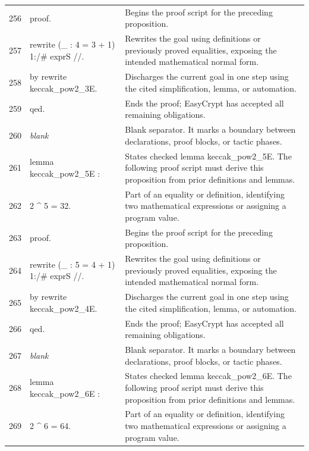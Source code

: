 \documentclass[10pt]{article}
\begin{document}
\begin{longtable}{r L{0.53\textwidth} L{0.37\textwidth}}
256 & {\ttfamily\scriptsize proof.} & Begins the proof script for the preceding proposition. \\
257 & {\ttfamily\scriptsize rewrite (\_ : 4 = 3 + 1) 1:/\# exprS //.} & Rewrites the goal using definitions or previously proved equalities, exposing the intended mathematical normal form. \\
258 & {\ttfamily\scriptsize by rewrite keccak\_pow2\_3E.} & Discharges the current goal in one step using the cited simplification, lemma, or automation. \\
259 & {\ttfamily\scriptsize qed.} & Ends the proof; EasyCrypt has accepted all remaining obligations. \\
260 & {\ttfamily\scriptsize \emph{blank}} & Blank separator.  It marks a boundary between declarations, proof blocks, or tactic phases. \\
261 & {\ttfamily\scriptsize lemma keccak\_pow2\_5E :} & States checked lemma keccak\_pow2\_5E.  The following proof script must derive this proposition from prior definitions and lemmas. \\
262 & {\ttfamily\scriptsize   2 \textasciicircum{} 5 = 32.} & Part of an equality or definition, identifying two mathematical expressions or assigning a program value. \\
263 & {\ttfamily\scriptsize proof.} & Begins the proof script for the preceding proposition. \\
264 & {\ttfamily\scriptsize rewrite (\_ : 5 = 4 + 1) 1:/\# exprS //.} & Rewrites the goal using definitions or previously proved equalities, exposing the intended mathematical normal form. \\
265 & {\ttfamily\scriptsize by rewrite keccak\_pow2\_4E.} & Discharges the current goal in one step using the cited simplification, lemma, or automation. \\
266 & {\ttfamily\scriptsize qed.} & Ends the proof; EasyCrypt has accepted all remaining obligations. \\
267 & {\ttfamily\scriptsize \emph{blank}} & Blank separator.  It marks a boundary between declarations, proof blocks, or tactic phases. \\
268 & {\ttfamily\scriptsize lemma keccak\_pow2\_6E :} & States checked lemma keccak\_pow2\_6E.  The following proof script must derive this proposition from prior definitions and lemmas. \\
269 & {\ttfamily\scriptsize   2 \textasciicircum{} 6 = 64.} & Part of an equality or definition, identifying two mathematical expressions or assigning a program value. \\

\end{longtable}
\end{document}
